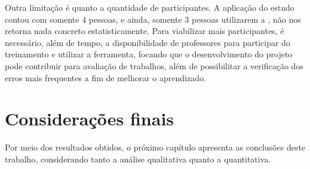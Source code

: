 		Outra limitação é quanto a quantidade de participantes.
		A aplicação do estudo contou com somente $4$ pessoas, e ainda, somente $3$ pessoas
		utilizarem a , não nos retorna nada concreto estatisticamente.
		Para
		viabilizar mais participantes, é necessário, além de tempo, a disponibilidade
		de professores para participar do treinamento e utilizar a ferramenta, focando
		que o desenvolvimento do projeto pode contribuir para avaliação de trabalhos,
		além de possibilitar a verificação dos erros mais frequentes a fim de melhorar o
		aprendizado.

	\section{Considerações finais}
	
		Por meio dos resultados obtidos, o próximo capítulo apresenta as conclusões deste trabalho, considerando tanto a análise qualitativa quanto a quantitativa.

